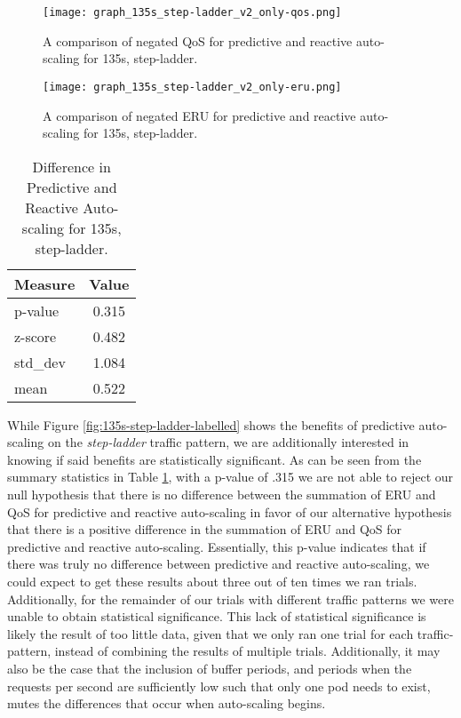\begin{figure}[!tbp]
  \centering
  \begin{minipage}[b]{0.4\textwidth}
    \texttt{[image: graph\_135s\_step-ladder\_v2\_only-qos.png]}
    \caption{A comparison of negated QoS for predictive and reactive
    auto-scaling for 135s, step-ladder.}
    \label{fig:135s-step-ladder-only-qos}
  \end{minipage}
  \hfill
  \begin{minipage}[b]{0.4\textwidth}
    \texttt{[image: graph\_135s\_step-ladder\_v2\_only-eru.png]}
    \caption{A comparison of negated ERU for predictive and reactive
    auto-scaling for 135s, step-ladder.}
    \label{fig:135s-step-ladder-only-eru}
  \end{minipage}
\end{figure}

\begin{table}[!b]
  \centering
  \caption{Difference in Predictive and Reactive Auto-scaling for 135s,
  step-ladder.}
  \label{tab:135s-step-ladder}
\begin{tabular}{l c}\hline\hline
    \multicolumn{1}{c}{\textbf{Measure}} & \textbf{Value} \\ \hline
     p-value & 0.315 \\
     z-score & 0.482 \\
     std\_dev & 1.084 \\
     mean & 0.522
  \end{tabular}
\end{table}

While Figure \ref{fig:135s-step-ladder-labelled} shows the benefits of predictive
auto-scaling on the \textit{step-ladder} traffic pattern,
we are additionally interested in knowing if said benefits are
statistically significant.
As can be seen from the summary statistics in Table \ref{tab:135s-step-ladder},
with a p-value of .315 we are not
able to reject our null hypothesis that there is no difference between the
summation of ERU and QoS for predictive and reactive auto-scaling in favor of
our alternative hypothesis that there is a positive difference in the summation
of ERU and QoS for predictive and reactive auto-scaling. Essentially, this
p-value indicates that if there was truly no difference between predictive and
reactive auto-scaling, we could expect to get these results about three out of
ten times we ran trials. Additionally, for the remainder of our trials with
different traffic patterns we were unable to obtain statistical significance.
This lack of statistical significance is likely the result of too little data,
given that we only ran one trial for each traffic-pattern, instead of combining
the results of multiple trials. Additionally, it may also be the case that the
inclusion of buffer periods, and periods when the requests per second are
sufficiently low such that only one pod needs to exist, mutes the
differences that occur when auto-scaling begins.
